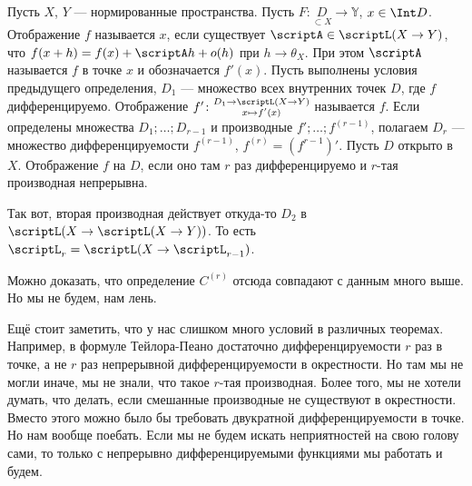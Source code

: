\documentclass{article}
\begin{document}
\begin{itemize}
\begin{Comment}
        \end{Comment}
        \dfn Пусть $X$, $Y$ --- нормированные пространства. Пусть $F\colon\underset{\subset X}D\to\mathbb Y$, $x\in\Int D$. Отображение $f$ называется  $x$, если существует $\scriptA\in\scriptL(X\to Y)$, что $f(x+h)=f(x)+\scriptA h+o(h)$ при $h\to\mathbb\theta_X$. При этом $\scriptA$ называется  $f$ в точке $x$ и обозначается $f'(x)$.
        \dfn Пусть выполнены условия предыдущего определения, $D_1$ --- множество всех внутренних точек $D$, где $f$ дифференцируемо. Отображение $f'\colon\substack{D_1\to\scriptL(X\to Y)\\x\mapsto f'(x)}$ называется  $f$.
        \dfn Если определены множества $D_1;\ldots;D_{r-1}$ и производные $f';\ldots;f^{(r-1)}$, полагаем $D_r$ --- множество дифференцируемости $f^{(r-1)}$, $f^{(r)}=(f^{r-1})'$.
        \dfn Пусть $D$ открыто в $X$. Отображение $f$  на $D$, если оно там $r$ раз дифференцируемо и $r$-тая производная непрерывна.
        \begin{Comment}
            Так вот, вторая производная действует откуда-то $D_2$ в $\scriptL(X\to\scriptL(X\to Y))$. То есть $\scriptL_r=\scriptL(X\to\scriptL_{r-1})$.
        \end{Comment}
        \thm Можно доказать, что определение $C^{(r)}$ отсюда совпадают с данным много выше. Но мы не будем, нам лень.
        \begin{Comment}
            Ещё стоит заметить, что у нас слишком много условий в различных теоремах. Например, в формуле Тейлора-Пеано достаточно дифференцируемости $r$ раз в точке, а не $r$ раз непрерывной дифференцируемости в окрестности. Но там мы не могли иначе, мы не знали, что такое $r$-тая производная. Более того, мы не хотели думать, что делать, если смешанные производные не существуют в окрестности. Вместо этого можно было бы требовать двукратной дифференцируемости в точке. Но нам вообще поебать. Если мы не будем искать неприятностей на свою голову сами, то только с непрерывно дифференцируемыми функциями мы работать и будем.
        \end{Comment}
    \end{itemize}
\end{document}
